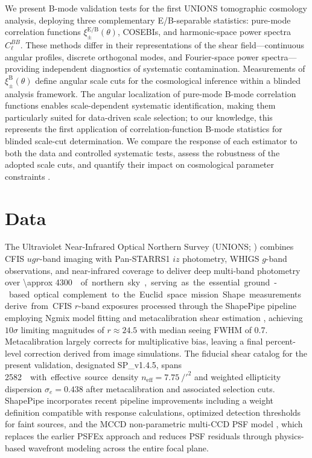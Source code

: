 \documentclass{aa}
\begin{document}
We present B-mode validation tests for the first UNIONS tomographic cosmology analysis, deploying three complementary E/B-separable statistics: pure-mode correlation functions $\xi_\pm^{\mathrm{E/B}}(\theta)$, COSEBIs, and harmonic-space power spectra $C_\ell^{BB}$. These methods differ in their representations of the shear field—continuous angular profiles, discrete orthogonal modes, and Fourier-space power spectra—providing independent diagnostics of systematic contamination. Measurements of $\xi_\pm^{\mathrm{B}}(\theta)$ define angular scale cuts for the cosmological inference within a blinded analysis framework. The angular localization of pure-mode B-mode correlation functions enables scale-dependent systematic identification, making them particularly suited for data-driven scale selection; to our knowledge, this represents the first application of correlation-function B-mode statistics for blinded scale-cut determination. We compare the response of each estimator to both the data and controlled systematic tests, assess the robustness of the adopted scale cuts, and quantify their impact on cosmological parameter constraints \citep{goh.etal25}.

\section{Data}

The Ultraviolet Near-Infrared Optical Northern Survey (UNIONS; \citealt{gwyn.etal25}) combines CFIS $ugr$-band imaging with Pan-STARRS1 $iz$ photometry, WHIGS $g$-band observations, and near-infrared coverage to deliver deep multi-band photometry over \SI{\approx 4300}{\square\deg} of northern sky, serving as the essential ground-based optical complement to the Euclid space mission. Shape measurements derive from CFIS $r$-band exposures processed through the ShapePipe pipeline employing Ngmix model fitting and metacalibration shear estimation \citep{farrens.etal22, guinot.etal22}, achieving $10\sigma$ limiting magnitudes of $r \approx 24.5$ with median seeing FWHM of \SI{0.7}{\arcsec}. Metacalibration largely corrects for multiplicative bias, leaving a final percent-level correction derived from image simulations. The fiducial shear catalog for the present validation, designated SP\_v1.4.5, spans \SI{2582}{\square\deg} with effective source density $n_{\mathrm{eff}} = \SI{7.75}{\per\square\arcmin}$ and weighted ellipticity dispersion $\sigma_e = 0.438$ after metacalibration and associated selection cuts. ShapePipe incorporates recent pipeline improvements including a weight definition compatible with response calculations, optimized detection thresholds for faint sources, and the MCCD non-parametric multi-CCD PSF model \citep{liaudat.etal21}, which replaces the earlier PSFEx approach and reduces PSF residuals through physics-based wavefront modeling across the entire focal plane.
\end{document}
